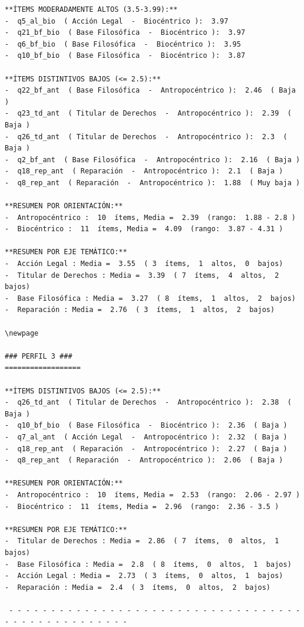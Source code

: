 \documentclass[
  11pt,
  letterpaper,
  DIV=11,
  numbers=noendperiod]{scrartcl}
\begin{document}
\begin{verbatim}
**ÍTEMS MODERADAMENTE ALTOS (3.5-3.99):**
-  q5_al_bio  ( Acción Legal  -  Biocéntrico ):  3.97 
-  q21_bf_bio  ( Base Filosófica  -  Biocéntrico ):  3.97 
-  q6_bf_bio  ( Base Filosófica  -  Biocéntrico ):  3.95 
-  q10_bf_bio  ( Base Filosófica  -  Biocéntrico ):  3.87 

**ÍTEMS DISTINTIVOS BAJOS (<= 2.5):**
-  q22_bf_ant  ( Base Filosófica  -  Antropocéntrico ):  2.46  ( Baja )
-  q23_td_ant  ( Titular de Derechos  -  Antropocéntrico ):  2.39  ( Baja )
-  q26_td_ant  ( Titular de Derechos  -  Antropocéntrico ):  2.3  ( Baja )
-  q2_bf_ant  ( Base Filosófica  -  Antropocéntrico ):  2.16  ( Baja )
-  q18_rep_ant  ( Reparación  -  Antropocéntrico ):  2.1  ( Baja )
-  q8_rep_ant  ( Reparación  -  Antropocéntrico ):  1.88  ( Muy baja )

**RESUMEN POR ORIENTACIÓN:**
-  Antropocéntrico :  10  ítems, Media =  2.39  (rango:  1.88 - 2.8 )
-  Biocéntrico :  11  ítems, Media =  4.09  (rango:  3.87 - 4.31 )

**RESUMEN POR EJE TEMÁTICO:**
-  Acción Legal : Media =  3.55  ( 3  ítems,  1  altos,  0  bajos)
-  Titular de Derechos : Media =  3.39  ( 7  ítems,  4  altos,  2  bajos)
-  Base Filosófica : Media =  3.27  ( 8  ítems,  1  altos,  2  bajos)
-  Reparación : Media =  2.76  ( 3  ítems,  1  altos,  2  bajos)

\newpage

### PERFIL 3 ###
==================

**ÍTEMS DISTINTIVOS BAJOS (<= 2.5):**
-  q26_td_ant  ( Titular de Derechos  -  Antropocéntrico ):  2.38  ( Baja )
-  q10_bf_bio  ( Base Filosófica  -  Biocéntrico ):  2.36  ( Baja )
-  q7_al_ant  ( Acción Legal  -  Antropocéntrico ):  2.32  ( Baja )
-  q18_rep_ant  ( Reparación  -  Antropocéntrico ):  2.27  ( Baja )
-  q8_rep_ant  ( Reparación  -  Antropocéntrico ):  2.06  ( Baja )

**RESUMEN POR ORIENTACIÓN:**
-  Antropocéntrico :  10  ítems, Media =  2.53  (rango:  2.06 - 2.97 )
-  Biocéntrico :  11  ítems, Media =  2.96  (rango:  2.36 - 3.5 )

**RESUMEN POR EJE TEMÁTICO:**
-  Titular de Derechos : Media =  2.86  ( 7  ítems,  0  altos,  1  bajos)
-  Base Filosófica : Media =  2.8  ( 8  ítems,  0  altos,  1  bajos)
-  Acción Legal : Media =  2.73  ( 3  ítems,  0  altos,  1  bajos)
-  Reparación : Media =  2.4  ( 3  ítems,  0  altos,  2  bajos)

 - - - - - - - - - - - - - - - - - - - - - - - - - - - - - - - - - - - - - - - - - - - - - - - - - - 
\end{verbatim}
\end{document}
